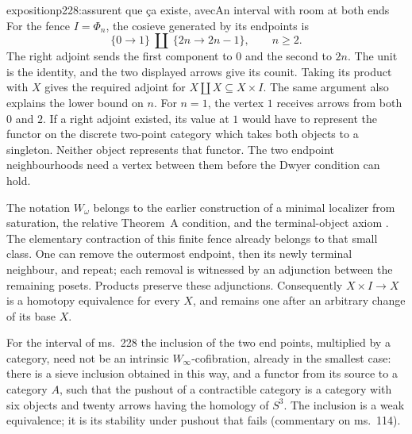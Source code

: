 \begin{dcomment}{exposition}{p228:assurent que ça existe, avec}{An interval with room at both ends}
For the fence $I=\Phi_n$, the cosieve generated by its endpoints is
\[
 \{0\longrightarrow1\}\ \amalg\
 \{2n\longrightarrow2n-1\},\qquad n\geq2.
\]
The right adjoint sends the first component to $0$ and the second to $2n$. The unit is the identity, and the two displayed arrows give its counit. Taking its product with $X$ gives the required adjoint for $X\amalg X\subseteq X\times I$. The same argument also explains the lower bound on $n$. For $n=1$, the vertex $1$ receives arrows from both $0$ and $2$. If a right adjoint existed, its value at $1$ would have to represent the functor on the discrete two-point category which takes both objects to a singleton. Neither object represents that functor. The two endpoint neighbourhoods need a vertex between them before the Dwyer condition can hold.

The notation $W_\omega$ belongs to the earlier construction of a minimal localizer from saturation, the relative Theorem~A condition, and the terminal-object axiom \citep[manuscript p.~14]{Grothendieck1990XIIa}. The elementary contraction of this finite fence already belongs to that small class. One can remove the outermost endpoint, then its newly terminal neighbour, and repeat; each removal is witnessed by an adjunction between the remaining posets. Products preserve these adjunctions. Consequently $X\times I\to X$ is a homotopy equivalence for every $X$, and remains one after an arbitrary change of its base $X$.

For the interval of ms.~228 the inclusion of the two end points, multiplied by a category, need not be an intrinsic $W_\infty$-cofibration, already in the smallest case: there is a sieve inclusion obtained in this way, and a functor from its source to a category $A$, such that the pushout of a contractible category is a category with six objects and twenty arrows having the homology of $S^3$. The inclusion is a weak equivalence; it is its stability under pushout that fails (commentary on ms.~114).
\end{dcomment}

